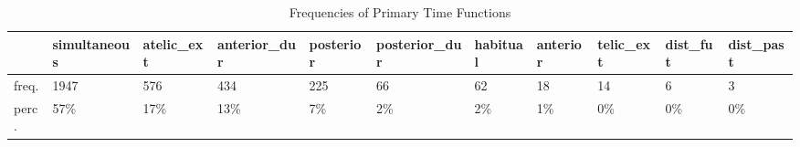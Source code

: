 \begin{table}[htbp!]
\centering
\caption{Frequencies of Primary Time Functions}
\label{table:funct_counts}
\begin{adjustbox}{width=1\textwidth}
\begin{tabular}{lllllllllll}
\toprule
{} & simultaneous & atelic\_ext & anterior\_dur & posterior & posterior\_dur & habitual & anterior & telic\_ext & dist\_fut & dist\_past \\
\midrule
freq. &         1947 &        576 &          434 &       225 &            66 &       62 &       18 &        14 &        6 &         3 \\
perc. &          57\% &        17\% &          13\% &        7\% &            2\% &       2\% &       1\% &        0\% &       0\% &        0\% \\
\bottomrule
\end{tabular}
\end{adjustbox}
\end{table}
